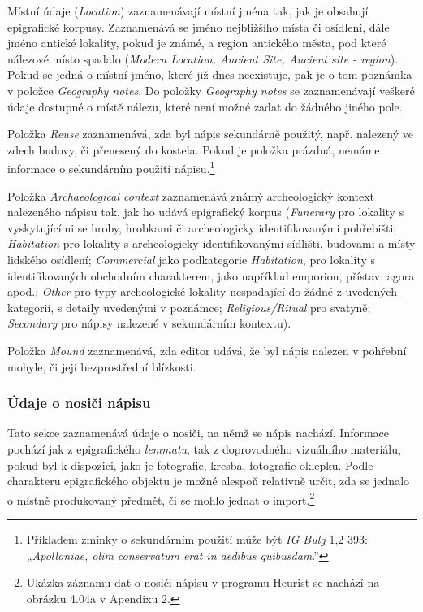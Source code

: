 \startitemize
\item
  \startblockquote
  Místní údaje ({\em Location}) zaznamenávají místní jména tak, jak je obsahují epigrafické korpusy. Zaznamenává se jméno nejbližšího místa či osídlení, dále jméno antické lokality, pokud je známé, a region antického města, pod které nálezové místo spadalo ({\em Modern Location, Ancient Site, Ancient site - region}). Pokud se jedná o místní jméno, které již dnes neexistuje, pak je o tom poznámka v položce {\em Geography notes}. Do položky {\em Geography notes} se zaznamenávají veškeré údaje dostupné o místě nálezu, které není možné zadat do žádného jiného pole.
  \stopblockquote
\item
  \startblockquote
  Položka {\em Reuse} zaznamenává, zda byl nápis sekundárně použitý, např. nalezený ve zdech budovy, či přenesený do kostela. Pokud je položka prázdná, nemáme informace o sekundárním použití nápisu.\footnote{Příkladem zmínky o sekundárním použití může být {\em IG Bulg} 1,2 393: „{\em Apolloniae, olim conservatum erat in aedibus quibusdam}.”}
  \stopblockquote
\item
  \startblockquote
  Položka {\em Archaeological context} zaznamenává známý archeologický kontext nalezeného nápisu tak, jak ho udává epigrafický korpus ({\em Funerary} pro lokality s vyskytujícími se hroby, hrobkami či archeologicky identifikovanými pohřebišti; {\em Habitation} pro lokality s archeologicky identifikovanými sídlišti, budovami a místy lidského osídlení; {\em Commercial} jako podkategorie {\em Habitation}, pro lokality s identifikovaných obchodním charakterem, jako například emporion, přístav, agora apod.; {\em Other} pro typy archeologické lokality nespadající do žádné z uvedených kategorií, s detaily uvedenými v poznámce; {\em Religious/Ritual} pro svatyně; {\em Secondary} pro nápisy nalezené v sekundárním kontextu).
  \stopblockquote
\item
  \startblockquote
  Položka {\em Mound} zaznamenává, zda editor udává, že byl nápis nalezen v pohřební mohyle, či její bezprostřední blízkosti.
  \stopblockquote
\stopitemize

\subsubsection[údaje-o-nosiči-nápisu]{Údaje o nosiči nápisu}

Tato sekce zaznamenává údaje o nosiči, na němž se nápis nachází. Informace pochází jak z epigrafického {\em lemmatu}, tak z doprovodného vizuálního materiálu, pokud byl k dispozici, jako je fotografie, kresba, fotografie oklepku. Podle charakteru epigrafického objektu je možné alespoň relativně určit, zda se jednalo o místně produkovaný předmět, či se mohlo jednat o import.\footnote{Ukázka záznamu dat o nosiči nápisu v programu Heurist se nachází na obrázku 4.04a v Apendixu 2.}

